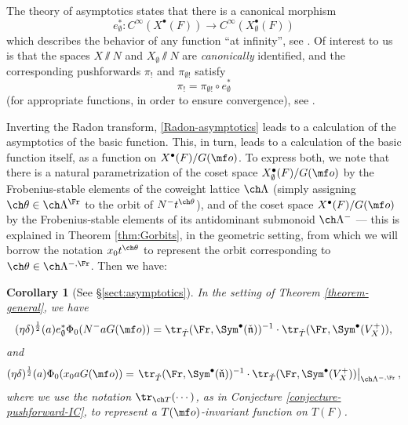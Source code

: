 \documentclass[final]{amsart}
\newtheorem{cor}[subsubsection]{Corollary}
\theoremstyle{remark}
\theoremstyle{definition}
\numberwithin{equation}{section}
\begin{document}
The theory of asymptotics states that there is a canonical morphism 
\[ e_\emptyset^*: C^\infty(X^\bullet(F)) \to C^\infty(X_\emptyset^\bullet(F))\] 
which describes the behavior of any function ``at infinity'', see \cite[\S 5]{SV}. Of interest to us is that the spaces $X\sslash N$ and $X_\emptyset\sslash N$ are \emph{canonically} identified, and the corresponding pushforwards $\pi_!$ and $\pi_{\emptyset !}$ satisfy
\begin{equation}\label{Radon-asymptotics} \pi_! = \pi_{\emptyset !} \circ e_\emptyset^*
\end{equation}
 (for appropriate functions, in order to ensure convergence), see 
\cite[Proposition 5.4.6]{SV}. 

Inverting the Radon transform, \eqref{Radon-asymptotics} leads to a calculation of the asymptotics of the basic function. This, in turn, leads to a calculation of the basic function itself, as a function on $X^\bullet(F)/G(\mf o)$. To express both, we note that there is a natural parametrization of the coset space $X_\emptyset^\bullet(F)/G(\mf o)$ by the Frobenius-stable elements of the coweight lattice $\ch\Lambda$ (simply assigning $\ch\theta \in \ch\Lambda^\Fr$ to the orbit of $N^-t^{\ch\theta}$), and of the coset space $X^\bullet(F)/G(\mf o)$ by the Frobenius-stable elements of its antidominant submonoid $\ch\Lambda^-$ --- this is explained in Theorem \ref{thm:Gorbits}, in the geometric setting, from which we will borrow the notation $x_0 t^{\ch\theta}$ to represent the orbit corresponding to $\ch\theta\in \ch\Lambda^{-,\Fr}$. Then we have:



\begin{cor}[See \S \ref{sect:asymptotics}] \label{cor:asymptotics}
In the setting of Theorem \ref{theorem-general}, we have 
 \begin{equation}
 \label{equation-asymptotics-IC}
(\eta\delta)^\frac{1}{2}(a)  e_\emptyset^* \Phi_0 (N^- a G(\mf o)) = \tr_{\check T}(\Fr, \Sym^\bullet (\check{\mathfrak n}))^{-1} \cdot \tr_{\check T}(\Fr, \Sym^\bullet (V_X^+)) ,
\end{equation}
and 
\begin{equation}
 \label{equation-basicfunction}
(\eta\delta)^\frac{1}{2}(a)  \Phi_0 (x_0 a G(\mf o)) = \left. \tr_{\check T}(\Fr, \Sym^\bullet (\check{\mathfrak n}))^{-1} \cdot \tr_{\check T}(\Fr, \Sym^\bullet (V_X^+))\right|_{\ch\Lambda^{-,\Fr}},
\end{equation}
where we use the notation $\tr_{\ch T}(\dotsb)$, as in Conjecture \ref{conjecture-pushforward-IC}, to represent a $T(\mf o)$-invariant function on $T(F)$. 
\end{cor}
\end{document}
